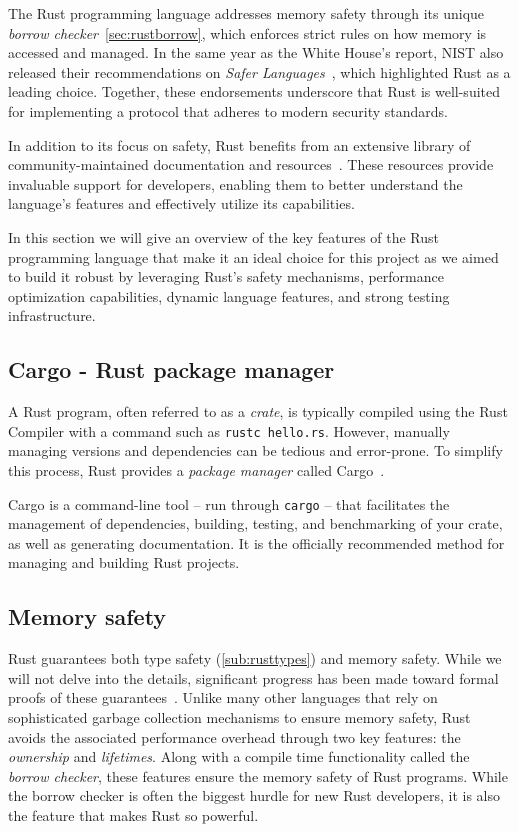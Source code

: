 \documentclass[11pt]{report}
\theoremstyle{definition}
\theoremstyle{plain}
\begin{document}
The Rust programming language addresses memory safety through its unique \textit{borrow checker}~\autoref{sec:rustborrow}, which enforces strict rules on how memory is accessed and managed. In the same year as the White House's report, NIST also released their recommendations on \textit{Safer Languages}~\cite{nistsaferlanguages}, which highlighted Rust as a leading choice. Together, these endorsements underscore that Rust is well-suited for implementing a protocol that adheres to modern security standards.

In addition to its focus on safety, Rust benefits from an extensive library of community-maintained documentation and resources~\cite{rustlangRustProgramming,rustlangPerformanceBook,lurklurkEffectiveRust}. These resources provide invaluable support for developers, enabling them to better understand the language's features and effectively utilize its capabilities.

In this section we will give an overview of the key features of the Rust programming language that make it an ideal choice for this project as we aimed to build it robust by leveraging Rust's safety mechanisms, performance optimization capabilities, dynamic language features, and strong testing infrastructure.

\subsection{Cargo - Rust package manager}\label{sec:cargo}
A Rust program, often referred to as a \textit{crate}, is typically compiled using the Rust Compiler with a command such as \texttt{rustc hello.rs}. However, manually managing versions and dependencies can be tedious and error-prone. To simplify this process, Rust provides a \textit{package manager} called Cargo~\cite{rustlangCargo}.

Cargo is a command-line tool -- run through \texttt{cargo} -- that facilitates the management of dependencies, building, testing, and benchmarking of your crate, as well as generating documentation. It is the officially recommended method for managing and building Rust projects.


\subsection{Memory safety}\label{sec:rustborrow} %
Rust guarantees both type safety (\autoref{sub:rusttypes}) and memory safety. While we will not delve into the details, significant progress has been made toward formal proofs of these guarantees~\cite{jung2017rustbelt}. Unlike many other languages that rely on sophisticated garbage collection mechanisms to ensure memory safety, Rust avoids the associated performance overhead through two key features: the \textit{ownership} and \textit{lifetimes}. Along with a compile time functionality called the \textit{borrow checker}, these features ensure the memory safety of Rust programs. While the borrow checker is often the biggest hurdle for new Rust developers, it is also the feature that makes Rust so powerful.
\end{document}

